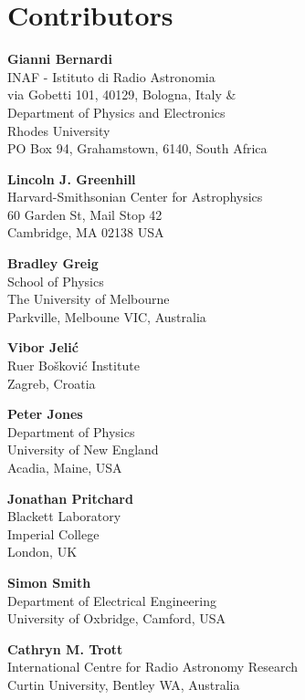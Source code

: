 
\chapter*{Contributors}
 


{\parskip=12pt

\noindent\textbf{Gianni Bernardi}\\
INAF - Istituto di Radio Astronomia\\
via Gobetti 101, 40129, Bologna, Italy \& \\
Department of Physics and Electronics\\
Rhodes University\\
PO Box 94, Grahamstown, 6140, South Africa

\noindent\textbf{Lincoln J. Greenhill}\\
Harvard-Smithsonian Center for Astrophysics\\
60 Garden St, Mail Stop 42\\
Cambridge, MA 02138 USA

\noindent\textbf{Bradley Greig}\\
School of Physics\\
The University of Melbourne\\
Parkville, Melboune VIC, Australia

\noindent\textbf{Vibor Jeli\'c}\\
Ru{\dj}er Bo\v{s}kovi\'{c} Institute\\ 
Zagreb, Croatia 

\noindent\textbf{Peter Jones}\\
Department of Physics\\
University of New England\\
Acadia, Maine, USA

\noindent\textbf{Jonathan Pritchard}\\
Blackett Laboratory\\
Imperial College\\
London, UK

\noindent\textbf{Simon Smith}\\
Department of Electrical Engineering\\
University of Oxbridge, 
Camford, USA

\noindent\textbf{Cathryn M. Trott}\\
International Centre for Radio Astronomy Research\\
Curtin University, Bentley WA, Australia

}

